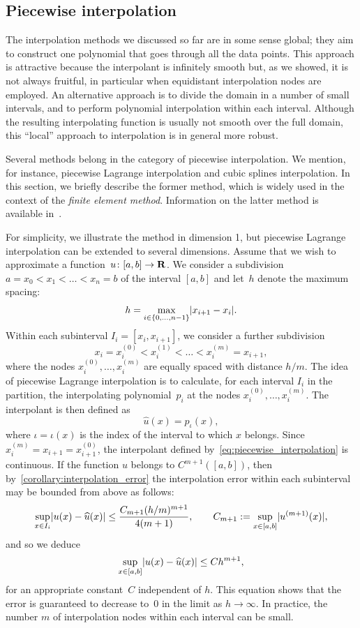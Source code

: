 \subsection{Piecewise interpolation}
The interpolation methods we discussed so far are in some sense global;
they aim to construct one polynomial that goes through all the data points.
This approach is attractive because the interpolant is infinitely smooth but,
as we showed, it is not always fruitful,
in particular when equidistant interpolation nodes are employed.
An alternative approach is to divide the domain in a number of small intervals,
and to perform polynomial interpolation within each interval.
Although the resulting interpolating function is usually not smooth over the full domain,
this ``local'' approach to interpolation is in general more robust.

Several methods belong in the category of piecewise interpolation.
We mention, for instance, piecewise Lagrange interpolation and cubic splines interpolation.
In this section,
we briefly describe the former method,
which is widely used in the context of the \emph{finite element method}.
Information on the latter method is available in~\cite[Section 8.7.1.]{MR2265914}.

For simplicity, we illustrate the method in dimension 1,
but piecewise Lagrange interpolation can be extended to several dimensions.
Assume that we wish to approximate a function~$u\colon [a, b] \to \mathbf R$.
We consider a subdivision $a = x_0 < x_1 < \dotsc < x_n = b$ of the interval $[a, b]$
and let~$h$ denote the maximum spacing:
\[
    h = \max_{i \in \{0, \dotsc, n-1\}} \lvert x_{i+1} - x_i\rvert.
\]
Within each subinterval $I_i = [x_i, x_{i+1}]$,
we consider a further subdivision
\[
    x_i = x_i^{(0)} < x_i^{(1)} < \dotsc < x_i^{(m)} = x_{i+1},
\]
where the nodes $x_i^{(0)}, \dotsc, x_i^{(m)}$ are equally spaced with distance $h/m$.
The idea of piecewise Lagrange interpolation is to calculate,
for each interval $I_i$ in the partition,
the interpolating polynomial~$p_i$ at the nodes $x_i^{(0)}, \dotsc, x_i^{(m)}$.
The interpolant is then defined as
\begin{equation}
    \label{eq:piecewise_interpolation}
    \widehat u(x) = p_{\iota}(x),
\end{equation}
where $\iota = \iota(x)$ is the index of the interval to which $x$ belongs.
Since $x_i^{(m)} = x_{i+1} = x_{i+1}^{(0)}$,
the interpolant defined by~\eqref{eq:piecewise_interpolation} is continuous.
If the function $u$ belongs to $C^{m+1}([a, b])$,
then by~\cref{corollary:interpolation_error} the interpolation error within each subinterval may be bounded from above as follows:
\[
    \sup_{x \in I_i} \lvert u(x) - \widehat u(x)\rvert \leq \frac{ C_{m+1} (h/m)^{m+1}}{4(m + 1)},
    \qquad C_{m+1} := \sup_{x \in [a, b]} \lvert u^{(m+1)}(x)\rvert,
\]
and so we deduce
\[
    \sup_{x \in [a, b]} \lvert u(x) - \widehat u(x)\rvert \leq C h^{m+1},
\]
for an appropriate constant~$C$ independent of $h$.
This equation shows that the error is guaranteed to decrease to~0 in the limit as $h \to \infty$.
In practice, the number $m$ of interpolation nodes within each interval can be small.

